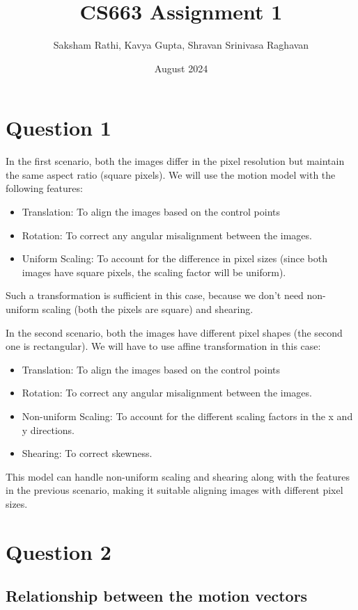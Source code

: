 \documentclass[12pt]{article}
\title{{\bf CS663 Assignment 1}}
\author{Saksham Rathi, Kavya Gupta, Shravan Srinivasa Raghavan}
\date{August 2024}
\begin{document}
\maketitle
\clearpage
\tableofcontents
\clearpage
\section*{Question 1}
In the first scenario, both the images differ in the pixel resolution but maintain the same aspect ratio (square pixels). We will use the motion model with the following features:
\begin{itemize}
    \item Translation: To align the images based on the control points
    \item Rotation: To correct any angular misalignment between the images.
    \item Uniform Scaling: To account for the difference in pixel sizes (since both images have square pixels, the scaling factor will be uniform).
\end{itemize}
Such a transformation is sufficient in this case, because we don't need non-uniform scaling (both the pixels are square) and shearing.


In the second scenario, both the images have different pixel shapes (the second one is rectangular). We will have to use affine transformation in this case:
\begin{itemize}
    \item Translation: To align the images based on the control points
    \item Rotation: To correct any angular misalignment between the images.
    \item Non-uniform Scaling: To account for the different scaling factors in the x and y directions.
    \item Shearing: To correct skewness.
\end{itemize}
This model can handle non-uniform scaling and shearing along with the features in the previous scenario, making it suitable aligning images with different pixel sizes.
\clearpage
\section*{Question 2}
    \vspace{-10pt}

    \subsection*{Relationship between the motion vectors}
\end{document}
